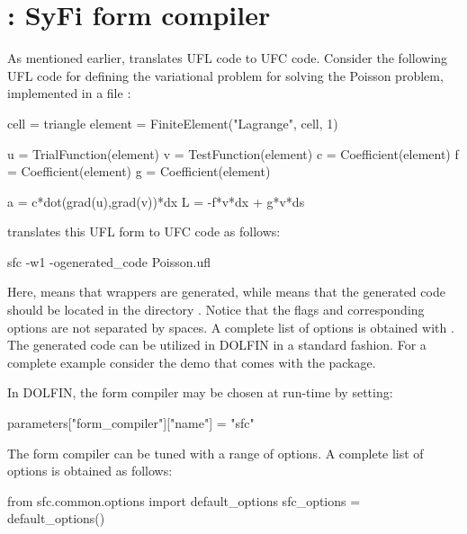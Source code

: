 \vspace*{4pt}
\section{\sfc{}: SyFi form compiler}

As mentioned earlier, \sfc{} translates UFL code to UFC code. Consider the
following UFL code for defining the variational problem for solving the
Poisson problem, implemented in a file :
\begin{python}
cell = triangle
element = FiniteElement("Lagrange", cell, 1)

u = TrialFunction(element)
v = TestFunction(element)
c = Coefficient(element)
f = Coefficient(element)
g = Coefficient(element)

a = c*dot(grad(u),grad(v))*dx
L = -f*v*dx + g*v*ds
\end{python}

\vspace*{1.5pt}

\noindent \sfc{} translates this UFL form to UFC code as follows:
\begin{bash}
sfc -w1  -ogenerated_code Poisson.ufl
\end{bash}

\vspace*{2pt}

\noindent Here,  means that \dolfin{} wrappers are generated, while
 means that the generated code should be
located in the directory . Notice that the flags
and corresponding options are not separated by spaces. A complete
list of options is obtained with \hbox{}.  The generated code can be
utilized in DOLFIN in a standard fashion.  For a complete example consider
the demo  that comes with the \syfi{} package.

\pagebreak

In DOLFIN, the form compiler may be chosen at run-time by setting:\vspace*{2pt}
\begin{python}
parameters["form_compiler"]["name"] = "sfc"
\end{python}
The form compiler can be tuned with a range of options. A complete list
of options is obtained as follows:
\begin{python}
from sfc.common.options import default_options
sfc_options = default_options()
\end{python}

